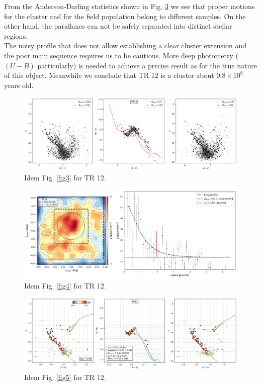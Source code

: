 \documentclass[draft]{aa}
\begin{document}
From the Anderson-Darling statistics shown in Fig. \ref{fig21} we see that
proper motions for the cluster and for the field population belong to different
samples. On the other hand, the parallaxes can not be safely separated into
distinct stellar regions.\\

The noisy profile that does not allow establishing a clear cluster extension
and the poor main sequence requires us to be cautious. More deep photometry
($(U-B)$ particularly) is needed to achieve a precise result as for the true
nature of this object. Meanwhile we conclude that TR 12 is a cluster
about $0.8\times10^9$ years old.

\begin{figure}[ht]
    \centering
    \includegraphics[width=\hsize]{../figs/obs_TR12.png}
    \caption{Idem Fig. \ref{fig3} for TR 12.}
    \label{fig19}
\end{figure}
\begin{figure}[ht]
    \centering
    \includegraphics[width=\hsize]{../figs/dmap_trumpler12.png}
    \caption{Idem Fig. \ref{fig4} for TR 12.}
    \label{fig20}
\end{figure}
\begin{figure}[ht]
    \centering
    \includegraphics[width=\hsize]{../figs/cmds_tr12.png}
    \caption{Idem Fig. \ref{fig5} for TR 12.}
    \label{fig21}
\end{figure}
\end{document}
